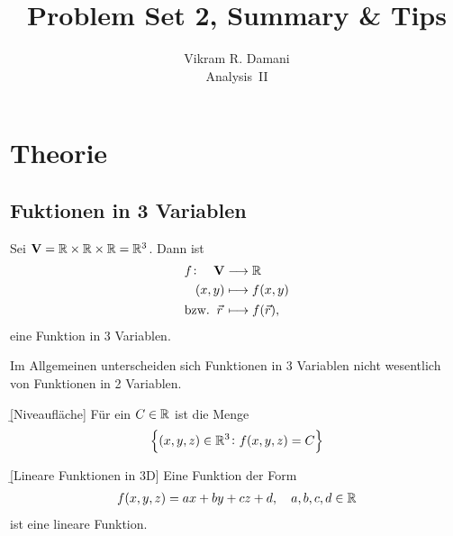 \documentclass[12pt]{article}
\begin{document}
\title{\vspace*{-2.5em}Problem Set 2, Summary \& Tips}
\author{Vikram R. Damani\\
    Analysis~II}

\maketitle


\section{Theorie}

\subsection{Fuktionen in 3 Variablen}

\begin{thmb}{}
    Sei $\mathbf{V}=\mathbb{R}\times\mathbb{R}\times\mathbb{R}=\mathbb{R}^3$. Dann ist
    \begin{align}
         & \begin{aligned}
               f\colon\quad \mathbf{V} & \longrightarrow\mathbb{R}  \\
               (x,y)                   & \longmapsto f(x,y)
           \end{aligned}    \\
         & \text{bzw.}\ \:\vec{r}\,\longmapsto f(\vec{r}),
    \end{align}
    eine Funktion in 3 Variablen.
\end{thmb}

Im Allgemeinen unterscheiden sich Funktionen in 3 Variablen nicht wesentlich
von Funktionen in 2 Variablen.\vspace*{1em}

\begin{defn}{\b{[Niveaufläche]}}
    Für ein $C\in\mathbb{R}$ ist die Menge
    \begin{align}
        \left\{(x,y,z)\in\mathbb{R}^3\colon f(x,y,z)=C\right\}
    \end{align}
\end{defn}

\begin{defn}{\b{{[Lineare Funktionen in 3D]}}}
    Eine Funktion der Form
    \begin{align}
        f(x,y,z)=ax+by+cz+d, \quad a,b,c,d\in\mathbb{R}
    \end{align}
    ist eine lineare Funktion.
\end{defn}\vspace*{1em}
\end{document}
